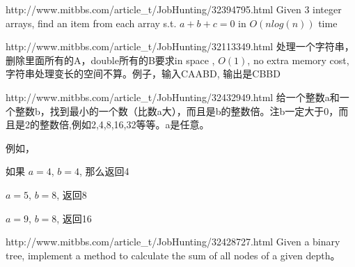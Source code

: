 \documentclass[a4paper]{article}
\begin{document}
\begin{CJK}{UTF8}{gbsn}
\begin{enumerate}
\begin{Q}[Facebook]{http://www.mitbbs.com/article_t/JobHunting/32394795.html}
Given 3 integer arrays, find an item from each array s.t. $a+b+c=0$ in $O(nlog(n))$ time
\end{Q}

\begin{Q}[Google]{http://www.mitbbs.com/article_t/JobHunting/32113349.html}
处理一个字符串，删除里面所有的A，double所有的B要求in space , $O(1)$, no extra memory cost, 字符串处理变长的空间不算。例子，输入CAABD, 输出是CBBD
\end{Q}

\begin{Q}[Google]{http://www.mitbbs.com/article_t/JobHunting/32432949.html}
给一个整数a和一个整数b，找到最小的一个数（比数a大），而且是b的整数倍。注b一定大于0，而且是2的整数倍,例如2,4,8,16,32等等。a是任意。

例如，

如果 $a = 4$, $b = 4$, 那么返回4

$a = 5$, $b = 8$, 返回8

$a = 9$, $b = 8$, 返回16
\end{Q}

\begin{Q}[TripAdvisor]{http://www.mitbbs.com/article_t/JobHunting/32428727.html}
Given a binary tree, implement a method to calculate the sum of all nodes of a given depth。
\end{Q}

\end{enumerate}
\end{CJK}
\end{document}
